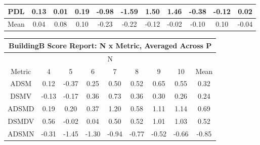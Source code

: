 \begin{longtable}{ | c || c | c | c | c | c | c | c | c | c || c |}
PDL &  \cellcolor[HTML]{FFFFFF} 0.13 &  \cellcolor[HTML]{FFFFFF} 0.01 &  \cellcolor[HTML]{F7F7FF} 0.19 &  \cellcolor[HTML]{FFE7E7} -0.98 &  \cellcolor[HTML]{FFD7D7} -1.59 &  \cellcolor[HTML]{D7D7FF} 1.50 &  \cellcolor[HTML]{D7D7FF} 1.46 &  \cellcolor[HTML]{FFF7F7} -0.38 &  \cellcolor[HTML]{FFFFFF} -0.12 &  \cellcolor[HTML]{FFFFFF} 0.02 \\
\hline
\hline
Mean  &  \cellcolor[HTML]{FFFFFF} 0.04 &  \cellcolor[HTML]{FFFFFF} 0.08 &  \cellcolor[HTML]{FFFFFF} 0.10 &  \cellcolor[HTML]{FFF7F7} -0.23 &  \cellcolor[HTML]{FFF7F7} -0.22 &  \cellcolor[HTML]{FFFFFF} -0.12 &  \cellcolor[HTML]{FFFFFF} -0.02 &  \cellcolor[HTML]{FFFFFF} -0.10 &  \cellcolor[HTML]{FFFFFF} 0.10 &  \cellcolor[HTML]{FFFFFF} -0.04 \\
\hline
\end{longtable}
\begin{longtable}{ | c || c | c | c | c | c | c | c || c |}
\hline
\multicolumn{9}{|c|}{ BuildingB Score Report: N x Metric, Averaged Across P } \\
\hline
\multicolumn{9}{|c|}{ N } \\
\hline
Metric & 4 & 5 & 6 & 7 & 8 & 9 & 10 & Mean\\
\hline
\hline
\endhead
ADSM &  \cellcolor[HTML]{FFFFFF} 0.12 &  \cellcolor[HTML]{FFF7F7} -0.37 &  \cellcolor[HTML]{F7F7FF} 0.25 &  \cellcolor[HTML]{EFEFFF} 0.50 &  \cellcolor[HTML]{EFEFFF} 0.52 &  \cellcolor[HTML]{EFEFFF} 0.65 &  \cellcolor[HTML]{EFEFFF} 0.55 &  \cellcolor[HTML]{F7F7FF} 0.32 \\
DSMV &  \cellcolor[HTML]{FFFFFF} -0.13 &  \cellcolor[HTML]{FFF7F7} -0.17 &  \cellcolor[HTML]{F7F7FF} 0.36 &  \cellcolor[HTML]{EFEFFF} 0.73 &  \cellcolor[HTML]{F7F7FF} 0.36 &  \cellcolor[HTML]{F7F7FF} 0.30 &  \cellcolor[HTML]{F7F7FF} 0.26 &  \cellcolor[HTML]{F7F7FF} 0.24 \\
ADSMD &  \cellcolor[HTML]{F7F7FF} 0.19 &  \cellcolor[HTML]{F7F7FF} 0.20 &  \cellcolor[HTML]{F7F7FF} 0.37 &  \cellcolor[HTML]{DFDFFF} 1.20 &  \cellcolor[HTML]{EFEFFF} 0.58 &  \cellcolor[HTML]{E7E7FF} 1.11 &  \cellcolor[HTML]{DFDFFF} 1.14 &  \cellcolor[HTML]{EFEFFF} 0.69 \\
DSMDV &  \cellcolor[HTML]{EFEFFF} 0.56 &  \cellcolor[HTML]{FFFFFF} -0.02 &  \cellcolor[HTML]{FFFFFF} 0.04 &  \cellcolor[HTML]{EFEFFF} 0.50 &  \cellcolor[HTML]{EFEFFF} 0.52 &  \cellcolor[HTML]{E7E7FF} 1.01 &  \cellcolor[HTML]{E7E7FF} 1.03 &  \cellcolor[HTML]{EFEFFF} 0.52 \\
ADSMN &  \cellcolor[HTML]{FFF7F7} -0.31 &  \cellcolor[HTML]{FFD7D7} -1.45 &  \cellcolor[HTML]{FFDFDF} -1.30 &  \cellcolor[HTML]{FFE7E7} -0.94 &  \cellcolor[HTML]{FFEFEF} -0.77 &  \cellcolor[HTML]{FFEFEF} -0.52 &  \cellcolor[HTML]{FFEFEF} -0.66 &  \cellcolor[HTML]{FFE7E7} -0.85 \\

\end{longtable}
